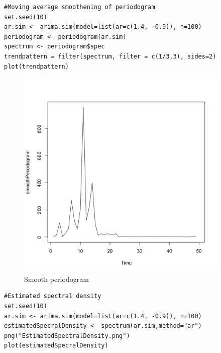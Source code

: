 \documentclass[11pt, oneside]{article}   	%
\begin{document}
\begin{lstlisting}
#Moving average smoothening of periodogram
set.seed(10)
ar.sim <- arima.sim(model=list(ar=c(1.4, -0.9)), n=100)
periodogram <- periodogram(ar.sim)
spectrum <- periodogram$spec
trendpattern = filter(spectrum, filter = c(1/3,3), sides=2)
plot(trendpattern)
\end{lstlisting}
\begin{figure}[H] %
   \centering
   \includegraphics[width=4in]{../code/smoonth.png} 
   \caption{Smooth periodogram}
   \label{fig:sm}
\end{figure}
\begin{lstlisting}
#Estimated spectral density
set.seed(10)
ar.sim <- arima.sim(model=list(ar=c(1.4, -0.9)), n=100)
estimatedSpecralDensity <- spectrum(ar.sim,method="ar")
png("EstimatedSpectralDensity.png")
plot(estimatedSpecralDensity)
\end{lstlisting}
\end{document}
